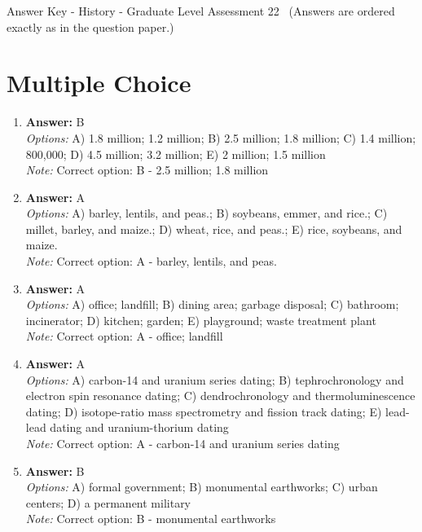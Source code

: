 \documentclass[12pt]{article}
\begin{document}
\begin{center}
Answer Key - History - Graduate Level Assessment 22 \
\small (Answers are ordered exactly as in the question paper.)
\end{center}

\section*{Multiple Choice}
\begin{enumerate}[label=\arabic*.]
\item \textbf{Answer:} B
\\ \textit{Options:} A) 1.8 million; 1.2 million; B) 2.5 million; 1.8 million; C) 1.4 million; 800,000; D) 4.5 million; 3.2 million; E) 2 million; 1.5 million
\\ \textit{Note:} Correct option: B - 2.5 million; 1.8 million
\item \textbf{Answer:} A
\\ \textit{Options:} A) barley, lentils, and peas.; B) soybeans, emmer, and rice.; C) millet, barley, and maize.; D) wheat, rice, and peas.; E) rice, soybeans, and maize.
\\ \textit{Note:} Correct option: A - barley, lentils, and peas.
\item \textbf{Answer:} A
\\ \textit{Options:} A) office; landfill; B) dining area; garbage disposal; C) bathroom; incinerator; D) kitchen; garden; E) playground; waste treatment plant
\\ \textit{Note:} Correct option: A - office; landfill
\item \textbf{Answer:} A
\\ \textit{Options:} A) carbon-14 and uranium series dating; B) tephrochronology and electron spin resonance dating; C) dendrochronology and thermoluminescence dating; D) isotope-ratio mass spectrometry and fission track dating; E) lead-lead dating and uranium-thorium dating
\\ \textit{Note:} Correct option: A - carbon-14 and uranium series dating
\item \textbf{Answer:} B
\\ \textit{Options:} A) formal government; B) monumental earthworks; C) urban centers; D) a permanent military
\\ \textit{Note:} Correct option: B - monumental earthworks
\end{enumerate}
\end{document}
